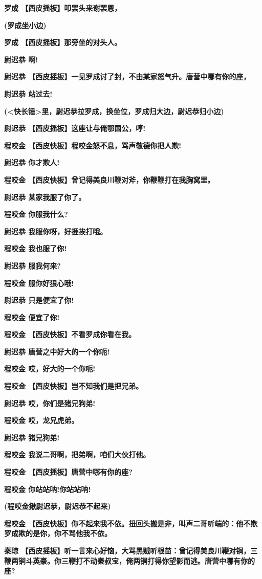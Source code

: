 \textbf{罗成 【西皮摇板】叩罢头来谢罢恩，}

\textbf{(罗成坐小边)}

\textbf{罗成 【西皮摇板】那旁坐的对头人。}

\textbf{尉迟恭 啊!}

\textbf{尉迟恭
【西皮摇板】一见罗成讨了封，不由某家怒气升。唐营中哪有你的座，}

\textbf{尉迟恭 站过去!}

\textbf{(\textless{}快长锤\textgreater{}里，尉迟恭拉罗成，换坐位，罗成归大边，尉迟恭归小边)}

\textbf{尉迟恭 【西皮摇板】这座让与俺鄂国公，哼!}

\textbf{程咬金 【西皮快板】程咬金怒不息，骂声敬德你把人欺!}

\textbf{尉迟恭 你才欺人!}

\textbf{程咬金 【西皮快板】曾记得美良川鞭对斧，你鞭鞭打在我胸窝里。}

\textbf{尉迟恭 某家我服了你了。}

\textbf{程咬金 你服我什么?}

\textbf{尉迟恭 我服你呀，好捱挨打哦。}

\textbf{程咬金 我也服了你!}

\textbf{尉迟恭 服我何来?}

\textbf{程咬金 服你好狠心哦!}

\textbf{尉迟恭 只是便宜了你!}

\textbf{程咬金 便宜了你!}

\textbf{程咬金 【西皮快板】不看罗成你看在我。}

\textbf{尉迟恭 唐营之中好大的一个你呃!}

\textbf{程咬金 哎，好大的一个你呃!}

\textbf{程咬金 【西皮快板】岂不知我们是把兄弟。}

\textbf{尉迟恭 哎，你们是猪兄狗弟!}

\textbf{程咬金 哎，龙兄虎弟。}

\textbf{尉迟恭 猪兄狗弟!}

\textbf{程咬金 我说二哥啊，把弟啊，咱们大伙打他。}

\textbf{程咬金 【西皮摇板】唐营中哪有你的座?}

\textbf{程咬金 你站站呐!你站站呐!}

\textbf{(程咬金揪尉迟恭，尉迟恭不起来)}

\textbf{程咬金
【西皮快板】你不起来我不依。扭回头搬是非，叫声二哥听端的：他不欺罗成欺的是你，你不骂他我不依。}

\textbf{秦琼
【西皮摇板】听一言来心好恼，大骂黑贼听根苗：曾记得美良川鞭对锏，三鞭两锏斗英豪。你三鞭打不动秦叔宝，俺两锏打得你望影而逃。唐营中哪有你的座?}

